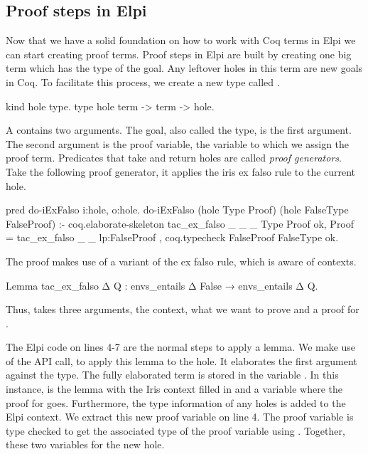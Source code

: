 \documentclass[thesis.tex]{subfiles}
\begin{document}
{{{{\subsection{Proof steps in Elpi}\label{ssec:proofselpi}
Now that we have a solid foundation on how to work with Coq terms in Elpi we can start creating proof terms. Proof steps in Elpi are built by creating one big term which has the type of the goal. Any leftover holes in this term are new goals in Coq. To facilitate this process, we create a new type called .
\begin{elpicode}
  kind hole type.
  type hole term -> term -> hole. 
\end{elpicode}
A  contains two arguments. The goal, also called the type, is the first argument. The second argument is the proof variable, the variable to which we assign the proof term. Predicates that take and return holes are called \emph{proof generators}.
Take the following proof generator, it applies the iris ex falso rule to the current hole.
\begin{elpicode}
  pred do-iExFalso i:hole, o:hole.
  do-iExFalso (hole Type Proof) 
              (hole FalseType FalseProof) :-
    coq.elaborate-skeleton 
      {{ tac_ex_falso _ _ _ }} Type Proof ok,
    Proof = {{ tac_ex_falso _ _ lp:FalseProof }},
    coq.typecheck FalseProof FalseType ok.
\end{elpicode}
The proof makes use of a variant of the ex falso rule, which is aware of contexts.
\begin{coqcode}
  Lemma tac_ex_falso Δ Q : 
    envs_entails Δ False → 
    envs_entails Δ Q.
\end{coqcode}
Thus,  takes three arguments, the context, what we want to prove and a proof for .

The Elpi code on lines 4-7 are the normal steps to apply a lemma. We make use of the \ce API call,  to apply this lemma to the hole. It elaborates the first argument against the type. The fully elaborated term is stored in the variable . In this instance,  is the lemma with the Iris context filled in and a variable where the proof for  goes. Furthermore, the type information of any holes is added to the Elpi context. We extract this new proof variable on line 4. The proof variable is type checked to get the associated type of the proof variable using . Together, these two variables for the new hole.

}}}}
\end{document}
